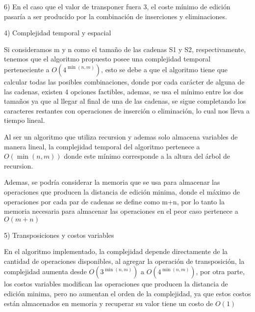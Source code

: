 6) En el caso que el valor de transponer fuera 3, el coste mínimo de edición
pasaría a ser producido por la combinación de inserciones y eliminaciones.


4) Complejidad temporal y espacial

Si consideramos m y n como el tamaño de las cadenas S1 y S2, 
respectivamente, tenemos que
el algoritmo propuesto posee una complejidad temporal 
perteneciente a $O\left(4^{\min(n, m)}\right)$, esto
se debe a que el algoritmo tiene que calcular todas las posibles
combinaciones, donde por cada carácter de alguna de las cadenas, existen
4 opciones factibles, ademas, se usa el mínimo entre los dos tamaños ya que
al llegar al final de una de las cadenas, se sigue completando los caracteres
restantes con operaciones de inserción o eliminación, 
lo cual nos lleva a tiempo lineal.

Al ser un algoritmo que utiliza recursion y ademas solo almacena variables
de manera lineal, la complejidad temporal del algoritmo pertenece a $O\left({\min(n, m)}\right)$ 
donde este mínimo corresponde a la altura del árbol de recursion.

Ademas, se podría considerar la memoria que se usa para almacenar las operaciones
que producen la distancia de edición minima, donde el máximo de operaciones
por cada par de cadenas se define como m+n, por lo tanto la memoria necesaria
para almacenar las operaciones en el peor caso pertenece a $O\left({m+n}\right)$


5) Transposiciones y costos variables

En el algoritmo implementado, la complejidad depende directamente
de la cantidad de operaciones disponibles, al agregar la operación 
de transposición, la complejidad aumenta desde $O\left(3^{\min(n, m)}\right)$ a 
$O\left(4^{\min(n, m)}\right)$, por otra parte, los costos variables
modifican las operaciones que producen la distancia de edición minima, pero no aumentan
el orden de la complejidad, ya que estos costos están almacenados en memoria
y recuperar su valor tiene un costo de $O\left({1}\right)$